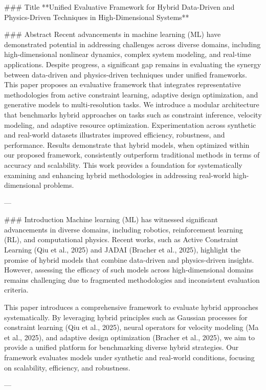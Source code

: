 ### Title  
**Unified Evaluative Framework for Hybrid Data-Driven and Physics-Driven Techniques in High-Dimensional Systems**  

### Abstract  
Recent advancements in machine learning (ML) have demonstrated potential in addressing challenges across diverse domains, including high-dimensional nonlinear dynamics, complex system modeling, and real-time applications. Despite progress, a significant gap remains in evaluating the synergy between data-driven and physics-driven techniques under unified frameworks. This paper proposes an evaluative framework that integrates representative methodologies from active constraint learning, adaptive design optimization, and generative models to multi-resolution tasks. We introduce a modular architecture that benchmarks hybrid approaches on tasks such as constraint inference, velocity modeling, and adaptive resource optimization. Experimentation across synthetic and real-world datasets illustrates improved efficiency, robustness, and performance. Results demonstrate that hybrid models, when optimized within our proposed framework, consistently outperform traditional methods in terms of accuracy and scalability. This work provides a foundation for systematically examining and enhancing hybrid methodologies in addressing real-world high-dimensional problems.  

---

### Introduction  
Machine learning (ML) has witnessed significant advancements in diverse domains, including robotics, reinforcement learning (RL), and computational physics. Recent works, such as Active Constraint Learning (Qiu et al., 2025) and JADAI (Bracher et al., 2025), highlight the promise of hybrid models that combine data-driven and physics-driven insights. However, assessing the efficacy of such models across high-dimensional domains remains challenging due to fragmented methodologies and inconsistent evaluation criteria.  

This paper introduces a comprehensive framework to evaluate hybrid approaches systematically. By leveraging hybrid principles such as Gaussian processes for constraint learning (Qiu et al., 2025), neural operators for velocity modeling (Ma et al., 2025), and adaptive design optimization (Bracher et al., 2025), we aim to provide a unified platform for benchmarking diverse hybrid strategies. Our framework evaluates models under synthetic and real-world conditions, focusing on scalability, efficiency, and robustness.  

---


